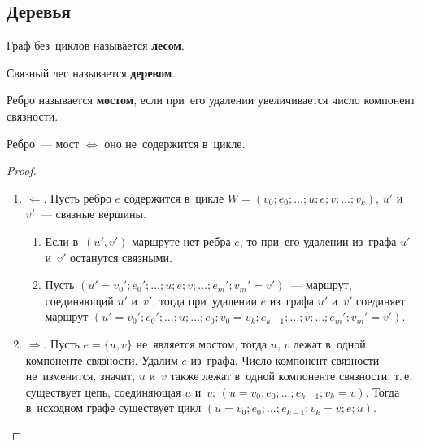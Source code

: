 \subsection{Деревья}
Граф без~циклов называется \textbf{лесом}.

Связный лес называется \textbf{деревом}.

Ребро называется \textbf{мостом}, если при~его удалении увеличивается число компонент связности.

\begin{statement}
\label{st:criterion_of_bridge_in_graph}
Ребро~--- мост $\Leftrightarrow$ оно не~содержится в~цикле.
\end{statement}
\begin{proof}
\begin{enumerate}
	\item $\Leftarrow$.
	Пусть ребро $e$ содержится в~цикле $W = (v_0; e_0; \ldots; u; e; v; \ldots; v_k)$, $u'$ и~$v'$~--- связные вершины.
	\begin{enumerate}
		\item Если в~$(u', v')$\nobreakdash-\hspace{0pt}маршруте нет ребра $e$, то при~его удалении из~графа $u'$ и~$v'$ останутся связными.
		\item Пусть $(u' = v_0'; e_0'; \ldots; u; e; v; \ldots; e_m'; v_m' = v')$~--- маршрут, соединяющий $u'$ и~$v'$, тогда при~удалении $e$ из~графа $u'$ и~$v'$ соединяет маршрут\newline
		$(u' = v_0'; e_0'; \ldots; u; \ldots; e_0; v_0 = v_k; e_{k-1}; \ldots; v; \ldots; e_m'; v_m' = v')$.
	\end{enumerate}
	
	\item $\Rightarrow$.
	Пусть $e = \{ u, v \}$ не~является мостом, тогда $u$, $v$ лежат в~одной компоненте связности.
	Удалим $e$ из~графа.
	Число компонент связности не~изменится, значит, $u$ и~$v$ также лежат в~одной компоненте связности, т.\,е. существует цепь, соединяющая $u$ и~$v$: $(u = v_0; e_0; \ldots; e_{k-1}; v_k = v)$.
	Тогда в~исходном графе существует цикл $(u = v_0; e_0; \ldots; e_{k-1}; v_k = v; e; u)$.
\end{enumerate}
\end{proof}

